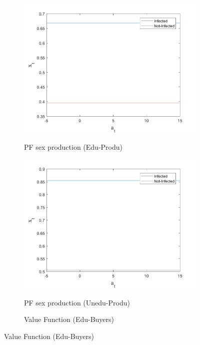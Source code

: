 \begin{figure}[H]
\bigskip
\begin{subfigure}{0.5\textwidth}\caption{PF sex production (Edu-Produ)}
   \includegraphics[width=\linewidth,height = 0.22\textheight]{figures/art/FIG11.png}
    \label{fig_dert}
\end{subfigure}
\hspace*{\fill}
\begin{subfigure}{0.5\textwidth}\caption{PF sex production (Unedu-Produ)}
   \includegraphics[width=\linewidth,height = 0.22\textheight]{figures/art/FIG12.png}
    \label{fig:x_b}
\end{subfigure}
\bigskip
\begin{subfigure}{0.5\textwidth}\caption{Value Function (Edu-Buyers)}

\end{subfigure}
\end{figure}
